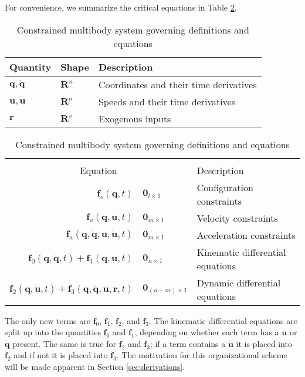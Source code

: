 \documentclass[smallcondensed,final]{svjour3}                     %
\begin{document}
For convenience, we summarize the critical equations in Table
\ref{table:assumptions}.


\begin{table}[htbp]
  \centering
  \caption{Constrained multibody system governing definitions and equations}
  \label{table:assumptions}
  \begin{tabular}[c]{l l l}
    Quantity & Shape & Description\\
    \hline
    $\bm{q},\bm{\dot{q}}$ & $\mathbf{R}^n$ & Coordinates and their time
    derivatives\\
    $\bm{u}, \bm{\dot{u}}$ & $\mathbf{R}^o$ & Speeds and their time derivatives\\
    $\bm{r}$ & $\mathbf{R}^s$ & Exogenous inputs \\
  \end{tabular}
  \begin{tabular}[c]{r @{ $=$ } l l}
    \multicolumn{3}{c}{ } \\
    \multicolumn{2}{c}{Equation} & Description \\
    \hline
    $\bm{f}_{c}(\bm{q}, t)$ & $\bm{0}_{l \times 1}$ & Configuration constraints \\
    $\bm{f}_{v}(\bm{q}, \bm{u}, t)$ & $\bm{0}_{m \times 1}$ & Velocity constraints \\
    $\bm{f}_{a}(\bm{q}, \bm{\dot{q}}, \bm{u}, \bm{\dot{u}}, t)$ & $\bm{0}_{m
    \times 1}$ & Acceleration constraints \\
    $\bm{f}_{0}(\bm{q}, \bm{\dot{q}}, t) + \bm{f}_{1}(\bm{q}, \bm{u}, t)$ &
    $\bm{0}_{n \times 1}$ & Kinematic differential equations \\
    $\bm{f}_{2}(\bm{q}, \bm{\dot{u}}, t) + \bm{f}_{3}(\bm{q}, \bm{\dot{q}},
    \bm{u}, \bm{r}, t)$ & $\bm{0}_{(o - m) \times 1}$ & Dynamic differential equations
  \end{tabular}
\end{table}

The only new terms are $\mathbf{f}_0$, $\mathbf{f}_1$, $\mathbf{f}_2$, and
$\mathbf{f}_3$.  The kinematic differential equations are split up into the
quantities $\mathbf{f}_0$ and $\mathbf{f}_1$, depending on whether each term
has a $\mathbf{u}$ or $\dot{\mathbf{q}}$ present.  The same is true for
$\mathbf{f}_2$ and $\mathbf{f}_3$; if a term contains a $\dot{\mathbf{u}}$ it
is placed into $\mathbf{f}_2$ and if not it is placed into $\mathbf{f}_3$. The
motivation for this organizational scheme will be made apparent in Section
\ref{sec:derivations}.
\end{document}
